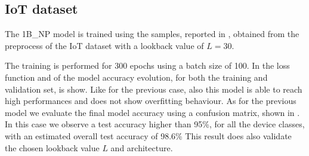 \subsection{IoT dataset}
\label{iot_final_res}


The 1B\_NP model is trained using the samples, reported in , obtained from the preprocess of the IoT dataset with a lookback value of $L=30$. 

The training is performed for 300 epochs using a batch size of 100. 
In  the loss function and of the model accuracy evolution, for both the training and validation set, is show. Like for the previous case, also this model is able to reach high performances and does not show overfitting behaviour. 
As for the previous model we evaluate the final model accuracy using a confusion matrix, shown in . In this case we observe a test accuracy higher than 95\%, for all the device classes, with an estimated overall test accuracy of 98.6\%
This result does also validate the chosen lookback value $L$ and architecture.


%

